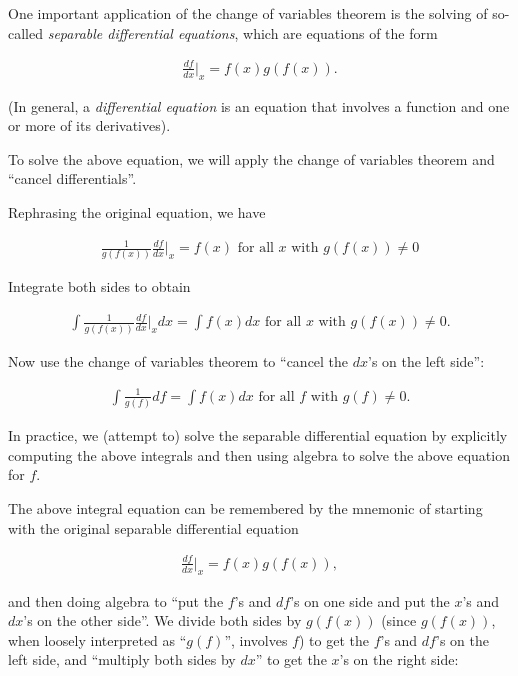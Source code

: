 \documentclass{article}
\begin{document}
One important application of the change of variables theorem is the solving of so-called \textit{separable differential equations}, which are equations of the form 

\begin{align*}
    \frac{df}{dx}\Big|_x = f(x) g(f(x)).
\end{align*}

(In general, a \textit{differential equation} is an equation that involves a function and one or more of its derivatives).

To solve the above equation, we will apply the change of variables theorem and ``cancel differentials''.

Rephrasing the original equation, we have

\begin{align*}
    \frac{1}{g(f(x))} \frac{df}{dx}\Big|_x = f(x) \text{ for all $x$ with $g(f(x)) \neq 0$}
\end{align*}

Integrate both sides to obtain

\begin{align*}
    \int \frac{1}{g(f(x))} \frac{df}{dx}\Big|_x dx = \int f(x) dx \text{ for all $x$ with $g(f(x)) \neq 0$}.
\end{align*}
 
Now use the change of variables theorem to ``cancel the $dx$'s on the left side'':

\begin{align*}
    \boxed
    {
        \int \frac{1}{g(f)} df = \int f(x) dx \text{ for all $f$ with $g(f) \neq 0$}.
    }
\end{align*}

In practice, we (attempt to) solve the separable differential equation by explicitly computing the above integrals and then using algebra to solve the above equation for $f$.

The above integral equation can be remembered by the mnemonic of starting with the original separable differential equation

\begin{align*}
    \frac{df}{dx}\Big|_x = f(x) g(f(x)),
\end{align*}

and then doing algebra to ``put the $f$'s and $df$'s on one side and put the $x$'s and $dx$'s on the other side''. We divide both sides by $g(f(x))$ (since $g(f(x))$, when loosely interpreted as ``$g(f)$'', involves $f$) to get the $f$'s and $df$'s on the left side, and ``multiply both sides by $dx$'' to get the $x$'s on the right side: 
\end{document}
